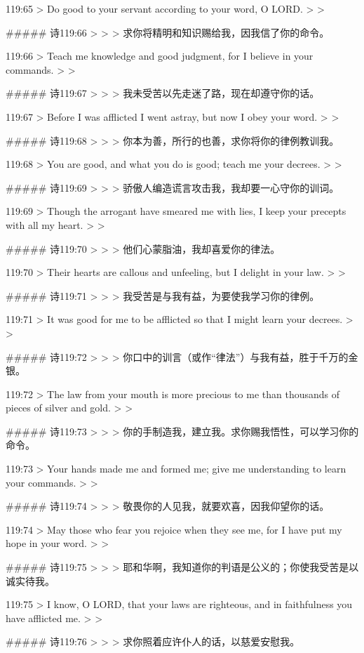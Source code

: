 119:65
> Do good to your servant according to your word, O LORD.
>
> 


##### 诗119:66
> 
>
> 求你将精明和知识赐给我，因我信了你的命令。


119:66
> Teach me knowledge and good judgment, for I believe in your commands.
>
> 


##### 诗119:67
> 
>
> 我未受苦以先走迷了路，现在却遵守你的话。


119:67
> Before I was afflicted I went astray, but now I obey your word.
>
> 


##### 诗119:68
> 
>
> 你本为善，所行的也善，求你将你的律例教训我。


119:68
> You are good, and what you do is good; teach me your decrees.
>
> 


##### 诗119:69
> 
>
> 骄傲人编造谎言攻击我，我却要一心守你的训词。


119:69
> Though the arrogant have smeared me with lies, I keep your precepts with all my heart.
>
> 


##### 诗119:70
> 
>
> 他们心蒙脂油，我却喜爱你的律法。


119:70
> Their hearts are callous and unfeeling, but I delight in your law.
>
> 


##### 诗119:71
> 
>
> 我受苦是与我有益，为要使我学习你的律例。


119:71
> It was good for me to be afflicted so that I might learn your decrees.
>
> 


##### 诗119:72
> 
>
> 你口中的训言（或作“律法”）与我有益，胜于千万的金银。


119:72
> The law from your mouth is more precious to me than thousands of pieces of silver and gold.
>
> 


##### 诗119:73
> 
>
> 你的手制造我，建立我。求你赐我悟性，可以学习你的命令。


119:73
> Your hands made me and formed me; give me understanding to learn your commands.
>
> 


##### 诗119:74
> 
>
> 敬畏你的人见我，就要欢喜，因我仰望你的话。


119:74
> May those who fear you rejoice when they see me, for I have put my hope in your word.
>
> 


##### 诗119:75
> 
>
> 耶和华啊，我知道你的判语是公义的；你使我受苦是以诚实待我。


119:75
> I know, O LORD, that your laws are righteous, and in faithfulness you have afflicted me.
>
> 


##### 诗119:76
> 
>
> 求你照着应许仆人的话，以慈爱安慰我。


